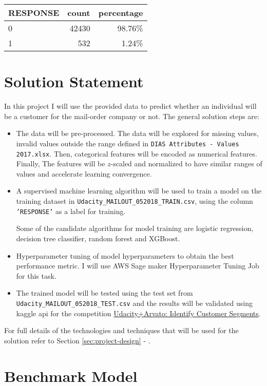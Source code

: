 \documentclass[a4paper]{article}
\begin{document}
\begin{tabular}{lrr}
\toprule
RESPONSE &  count &  percentage \\
\midrule
0 &     42430 &     98.76\% \\
1 &       532 &      1.24\% \\
\bottomrule
\end{tabular}

\section{Solution Statement}
  \label{sec:solution-statement}
  In this project I will use the provided data to predict whether an individual will be a customer for the mail-order company or not.
  The general solution steps are:
  \begin{itemize}
  \item The data will be pre-processed. The data will be explored for missing values, invalid values outside the range defined in \texttt{DIAS Attributes - Values 2017.xlsx}.
    Then, categorical features will be encoded as numerical features. Finally, The features will be $z$-scaled and normalized to have similar ranges of values and accelerate learning convergence.
  \item A supervised machine learning algorithm will be used to train a model on the training dataset in \texttt{Udacity\_MAILOUT\_052018\_TRAIN.csv}, using the column \texttt{'RESPONSE'} as a label for training.

    Some of the candidate algorithms for model training are logistic regression, decision tree classifier, random forest and XGBoost.
  \item Hyperparameter tuning of model hyperparameters to obtain the best performance metric. I will use AWS Sage maker Hyperparameter Tuning Job for this task.
  \item The trained model will be tested using the test set from \texttt{Udacity\_MAILOUT\_052018\_TEST.csv} and the results will be validated using kaggle api for the competition \href{https://www.kaggle.com/c/udacity-arvato-identify-customers/data}{Udacity+Arvato: Identify Customer Segments}.
  \end{itemize}

  For full details of the technologies and techniques that will be used for the solution refer to Section \ref{sec:project-design} - .

  
\section{Benchmark Model}
\label{sec:benchmark-model}
\end{document}
